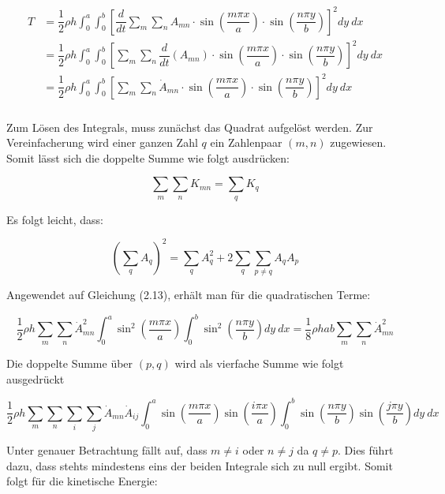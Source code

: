 \begin{align}
\begin{split}
T &= \dfrac{1}{2}\rho h \int_0^a \int_0^b  \left[\dfrac{d}{dt} \sum_m \sum_n A_{mn} \cdot \sin\left(\dfrac{m \pi x}{a}\right) \cdot \sin\left(\dfrac{n \pi y}{b}\right) \right]^2 dy \ dx  \\
&= \dfrac{1}{2} \rho h\int_0^a \int_0^b  \left[ \sum_m \sum_n \dfrac{d}{dt}\left(A_{mn}\right) \cdot \sin\left(\dfrac{m \pi x}{a}\right) \cdot \sin\left(\dfrac{n \pi y}{b}\right) \right]^2 dy \ dx \\
&= \dfrac{1}{2} \rho h \int_0^a \int_0^b  \left[ \sum_m \sum_n \dot{A}_{mn} \cdot \sin\left(\dfrac{m \pi x}{a}\right) \cdot \sin\left(\dfrac{n \pi y}{b}\right) \right]^2 dy \ dx \\
\end{split}
\end{align}

Zum Lösen des Integrals, muss zunächst das Quadrat aufgelöst werden. Zur Vereinfacherung wird einer ganzen Zahl $q$ ein Zahlenpaar $(m,n)$ zugewiesen.
Somit lässt sich die doppelte Summe wie folgt ausdrücken:

$$\sum_m\sum_n K_{mn}=\sum_q K_q$$

Es folgt leicht, dass:

$$\left(\sum_qA_q\right)^2=\sum_qA^2_q+2\sum_q\sum_{p\neq q}A_qA_p$$


Angewendet auf Gleichung (2.13), erhält man für die quadratischen Terme:

\begin{equation}
\dfrac{1}{2}\rho h \sum_m\sum_n \dot{A}^2_{mn}\int_0^a\sin^2\left(\dfrac{m\pi x}{a}\right)\int_0^b\sin^2\left(\dfrac{n\pi y}{b}\right) dy \ dx=\dfrac{1}{8}\rho h a b\sum_m\sum_n \dot{A}^2_{mn}
\end{equation}

Die doppelte Summe über $(p,q)$ wird als vierfache Summe wie folgt ausgedrückt

\begin{equation}
\dfrac{1}{2}\rho h \sum_m\sum_n\sum_i\sum_j \dot{A}_{mn}\dot{A}_{ij}\int_0^a\sin\left(\dfrac{m\pi x}{a}\right)\sin\left(\dfrac{i\pi x}{a}\right)\int_0^b\sin\left(\dfrac{n\pi y}{b}\right)\sin\left(\dfrac{j\pi y}{b}\right) dy \ dx
\end{equation}

Unter genauer Betrachtung fällt auf, dass $m\neq i$ oder $n\neq j$ da $q\neq p$. Dies führt dazu, dass stehts mindestens eins der beiden Integrale sich zu null ergibt. Somit folgt für die kinetische Energie:

